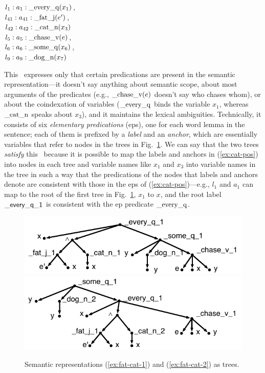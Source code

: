 \begin{examples}
\item \label{ex:cat-pos}
$l_1:a_1:\mathrm{\_every\_q}(x_1)$, \\
$l_{41}:a_{41}:\mathrm{\_fat\_j}(e')$,\\
$l_{42}:a_{42}:\mathrm{\_cat\_n}(x_3)$\\
$l_5:a_5:\mathrm{\_chase\_v}(e)$, \\
$l_6:a_6:\mathrm{\_some\_q}(x_6)$, \\
$l_9:a_9:\mathrm{\_dog\_n}(x_7)$
\end{examples}

This \rmrs\ expresses only that certain predications are present in
the semantic representation---it doesn't say anything about
semantic scope, about most arguments of the
predicates (e.g., $\mathrm{\_chase\_v}(e)$ doesn't say who chases
whom), or about the coindexation of variables ($\mathrm{\_every\_q}$
binds the variable $x_1$, whereas $\mathrm{\_cat\_n}$ speaks about
$x_3$), and it maintains the lexical ambiguities.  Technically, it
consists of six \emph{elementary predications} ({\sc ep}s), one for
each word lemma in the sentence; each of them is prefixed by a
\emph{label} and an \emph{anchor}, which are essentially variables
that refer to nodes in the trees in Fig.~\ref{fig:1}.  We can say that
the two trees \emph{satisfy} this \rmrs\ because it is possible to map
the labels and anchors in (\ref{ex:cat-pos}) into nodes in each tree
and variable names like 
$x_1$ and $x_3$ into variable names in the tree in such a way that the
predications of the nodes that labels and anchors denote are 
consistent with those in the {\sc ep}s of (\ref{ex:cat-pos})---e.g.,
$l_1$ and $a_1$
can map to the root of the first tree in Fig.~\ref{fig:1}, $x_1$ to
$x$, and the root label 
$\mathsf{\_every\_q\_1}$ is consistent with the {\sc ep} predicate
$\mathrm{\_every\_q}$.

\begin{figure}[t]
\centering
\includegraphics[scale=0.8]{pic-cat-chased-dog} \\
\includegraphics[scale=0.8]{pic-cat-chased-dog-2}
\caption{Semantic representations (\ref{ex:fat-cat-1}) and
  (\ref{ex:fat-cat-2}) as trees. \label{fig:1}}
\end{figure}



